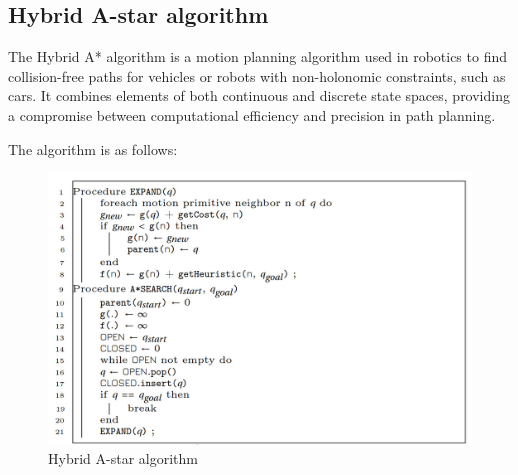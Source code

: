 \documentclass[12pt,a4paper]{article}
\begin{document}
\subsection{Hybrid A-star algorithm}\label{sec:Hybrid A-star algorithm} \par


The Hybrid A* algorithm is a motion planning algorithm used in robotics to find collision-free paths for vehicles or robots with non-holonomic constraints, such as cars. It combines elements of both continuous and discrete state spaces, providing a compromise between computational efficiency and precision in path planning. \par
The algorithm is as follows:

\begin{figure}[h!]
\begin{center}
\includegraphics[width=1.0\columnwidth]{images/astar.jpeg}
\end{center}
\caption{Hybrid A-star algorithm}
\label{fig:Hybrid_A-star}
\end{figure}
\end{document}
